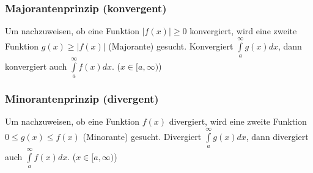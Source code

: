 \subsubsection{Majorantenprinzip (konvergent)}
  Um nachzuweisen, ob eine Funktion $|f(x)| \geq 0$ konvergiert, wird eine zweite
  Funktion $g(x) \geq |f(x)|$ (Majorante) gesucht. Konvergiert $\int\limits_a^{\infty} g(x) dx$,
  dann konvergiert auch $\int\limits_a^{\infty} f(x) dx$. ($x \in [a, \infty)$)

\subsubsection{Minorantenprinzip (divergent)}
  Um nachzuweisen, ob eine Funktion $f(x)$ divergiert, wird eine zweite
  Funktion $0 \leq g(x) \leq f(x)$ (Minorante) gesucht. Divergiert
  $\int\limits_a^{\infty} g(x) dx$,
  dann divergiert auch $\int\limits_a^{\infty} f(x) dx$. ($x \in [a, \infty)$)
  